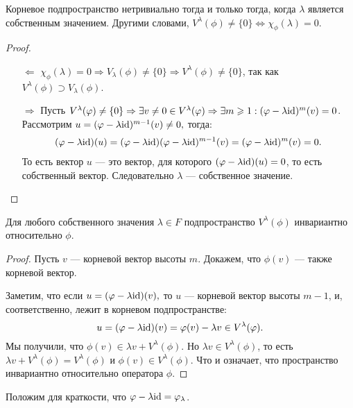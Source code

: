 \begin{Suggestion}
	Корневое подпространство нетривиально тогда и только тогда, когда $\lambda$ является собственным значением. Другими словами, $V^{\lambda}(\phi) \neq \{0\} 	
	\Leftrightarrow \chi_{\phi}(\lambda) = 0.$
\end{Suggestion}
\begin{proof}\
	\begin{itemize}
		\item[$\Leftarrow$]
		$\chi_{\phi}(\lambda) = 0 \Rightarrow V_{\lambda}(\phi) \neq \{0\} \Rightarrow V^{\lambda}(\phi) \neq \{0\}$, так как $V^{\lambda}(\phi) \supset V_{\lambda}(\phi)$.
		\item[$\Rightarrow$]
		Пусть $V^{\lambda}(\varphi) \neq \{0\} \Rightarrow \exists v \neq 0 \in V^{\lambda}(\varphi) \Rightarrow \exists m \geqslant 1: (\varphi - \lambda \mathrm{id})^{m}(v) = 0$. \\
		Рассмотрим $u = (\varphi - \lambda \mathrm{id})^{m - 1}(v) \neq 0,$ тогда:
		\begin{gather*}
		(\varphi - \lambda \mathrm{id})(u) = (\varphi - \lambda \mathrm{id})(\varphi - \lambda \mathrm{id})^{m - 1}(v) = (\varphi - \lambda \mathrm{id})^{m}(v) = 0.
		\end{gather*}
		То есть вектор $u$ --- это вектор, для которого $(\varphi - \lambda \mathrm{id})(u) = 0$, то есть собственный вектор. Следовательно $\lambda$ --- собственное значение.
	\end{itemize}
\end{proof}
\begin{Suggestion}
	Для любого собственного значения $\lambda \in F$ подпространство $V^{\lambda}(\phi)$ инвариантно относительно $\phi$.
\end{Suggestion}
\begin{proof}
	Пусть $v$ --- корневой вектор высоты $m$. Докажем, что $\phi(v)$ --- также корневой вектор. 
	
	Заметим, что если $u = (\varphi - \lambda \mathrm{id})(v),$ то $u$ --- корневой вектор высоты $m - 1$, и, соответственно, лежит в корневом подпространстве:
	$$
	u = (\varphi - \lambda \mathrm{id})(v) = \varphi(v) - \lambda{v} \in V^{\lambda}(\varphi).
	$$
	Мы получили, что 
	$\phi(v) \in \lambda{v} + V^{\lambda}(\phi).$ 
	Но $\lambda{v} \in V^{\lambda}(\phi)$, то есть $\lambda{v} + V^{\lambda}(\phi) = V^{\lambda}(\phi)$ и $\phi(v) \in V^{\lambda}(\phi)$. Что и означает, что пространство инвариантно относительно оператора $\phi$.
\end{proof}
Положим для краткости, что $\varphi - \lambda \mathrm{id} = \varphi_{\lambda}$.

